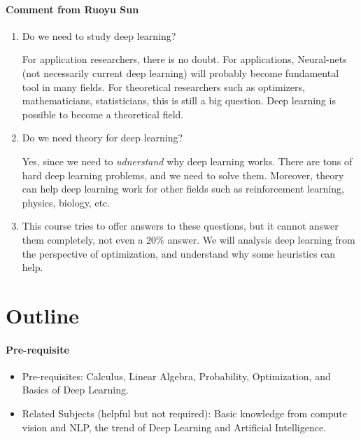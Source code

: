 \paragraph{Comment from Ruoyu Sun}
\begin{enumerate}
\item
Do we need to study deep learning?

For application researchers, there is no doubt. For applications, Neural-nets (not necessarily current deep learning) will probably become fundamental tool in many fields.
For theoretical researchers such as optimizers, mathematicians, statisticians, this is still a big question. 
Deep learning is possible to become a theoretical field.
\item
Do we need theory for deep learning?

Yes, since we need to \emph{udnerstand} why deep learning works. There are tons of hard deep learning problems, and we need to solve them. Moreover, theory can help deep learning work for other fields such as reinforcement learning, physics, biology, etc.
\item
This course tries to offer answers to these questions, but it cannot answer them completely, not even a $20\%$ answer. We will analysis deep learning from the perspective of optimization, and understand why some heuristics can help.
\end{enumerate}

\section{Outline}
\paragraph{Pre-requisite}
\begin{itemize}
\item
Pre-requisites: Calculus, Linear Algebra, Probability, Optimization, and Basics of Deep Learning.
\item
Related Subjects (helpful but not required): Basic knowledge from compute vision and NLP, the trend of Deep Learning and Artificial Intelligence.
\end{itemize}
